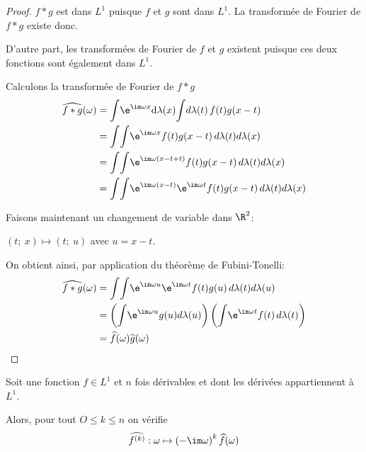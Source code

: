 \begin{proof}
$f*g$ est dans $L^1$ puisque $f$ et $g$ sont dans $L^1$. La transformée de Fourier de $f*g$ existe donc. 

D'autre part, les transformées de Fourier de $f$ et $g$ existent puisque ces deux fonctions sont également dans $L^1$.

Calculons la transformée de Fourier de $f*g$
\begin{align*}
\widehat{f*g}(\omega) & = \displaystyle{\int} \e^{\im \omega x} \mathrm d \lambda(x) \displaystyle{\int} d \lambda(t) \, f(t)g(x-t) \\
 & = \displaystyle{\int}  \displaystyle{\int} \e^{\im \omega x} f(t)g(x-t) \, d \lambda(t) d \lambda(x) \\
 & = \displaystyle{\int}  \displaystyle{\int} \e^{\im \omega (x-t+t)} f(t)g(x-t) \, d \lambda(t) d \lambda(x) \\ 
  & = \displaystyle{\int}  \displaystyle{\int} \e^{\im \omega (x-t)} \e^{\im \omega t} f(t)g(x-t) \, d \lambda(t) d \lambda(x)
\end{align*}

Faisons maintenant un changement de variable dans $\R^2$: 

$(t;~x) \mapsto (t;~u)$ avec $u=x-t$.

On obtient ainsi, par application du théorème de Fubini-Tonelli:
\begin{align*}
\widehat{f*g}(\omega) & = \displaystyle{\int}  \displaystyle{\int} \e^{\im \omega u} \e^{\im \omega t} f(t)g(u) \, d \lambda(t) d \lambda(u) \\
 & = \left( \displaystyle{\int}  \e^{\im \omega u} g(u) d \lambda(u) \right) \left( \displaystyle{\int} \e^{\im \omega t} f(t) \, d \lambda(t) \right) \\
 & = \widehat{f}(\omega) \widehat{g}(\omega)
\end{align*}

\end{proof}

\begin{prop}
Soit une fonction $f \in L^1$ et $n$ fois dérivables et dont les dérivées appartiennent à $L^1$.

Alors, pour tout $O \leq k \leq n$ on vérifie
\[
\widehat{f^{(k)}}: \omega \mapsto \left(-\im \omega\right)^k \widehat{f}(\omega)
\]
\end{prop}


